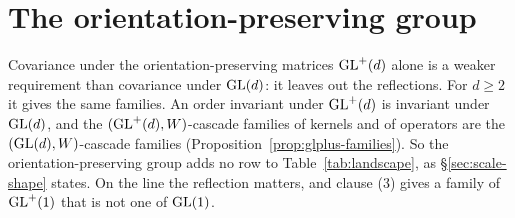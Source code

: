 
\section{The orientation-preserving group}\label{app:orientation}

Covariance under the orientation-preserving matrices $\mathrm{GL}^+(d)$ alone is a weaker requirement than
covariance under $\mathrm{GL}(d)$: it leaves out the reflections. For $d \ge 2$ it gives the same families. An
order invariant under $\mathrm{GL}^+(d)$ is invariant under $\mathrm{GL}(d)$, and the $(\mathrm{GL}^+(d), W)$-cascade families of
kernels and of operators are the $(\mathrm{GL}(d), W)$-cascade families (Proposition~\ref{prop:glplus-families}).
So the orientation-preserving group adds no row to Table~\ref{tab:landscape}, as \S\ref{sec:scale-shape}
states. On the line the reflection matters, and clause (3) gives a family of $\mathrm{GL}^+(1)$ that is not one
of $\mathrm{GL}(1)$.

